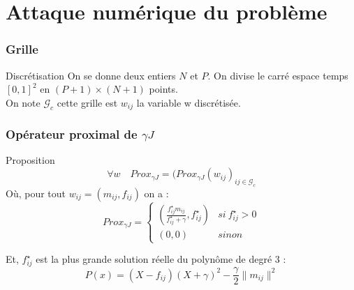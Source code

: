 \documentclass{beamer}
\begin{document}
\section{Attaque numérique du problème}
\begin{frame}
\frametitle{Grille}
\begin{block}{Discrétisation}
On se donne deux entiers $N$ et $P$. On divise le carré espace temps $[0,1]^2$ en $(P+1)\times(N+1)$ points.\\
On note $\mathcal{G}_c$ cette grille est $w_{ij}$ la variable w discrétisée.


\end{block}
\end{frame}

\begin{frame}
\frametitle{Opérateur proximal de $\gamma J$}
\begin{block}{Proposition}
$$
\forall w  \quad Prox_{\gamma J} = (Prox_{\gamma J} (w_{ij})_{ij\in\mathcal{G}_c}
$$
Où, pour tout $w_{ij}=(m_{ij},f_{ij})$ on a : 
$$
Prox_{\gamma J} = \left\{
\begin{array}{ccl}
(\frac{f_{ij}^{\star}m_{ij}}{f_{ij}^{\star} + \gamma},f_{ij}^{\star}) & si\ f_{ij}^{\star} >0\\
(0,0) & sinon
\end{array}\right.
$$

Et, $f_{ij}^{\star}$ est la plus grande solution réelle du polynôme de degré 3 : 
$$
P(x) = (X - f_{ij})(X+\gamma)^2 - \frac{\gamma}{2}\|m_{ij}\|^2
$$

\end{block}
\end{frame}
\end{document}
